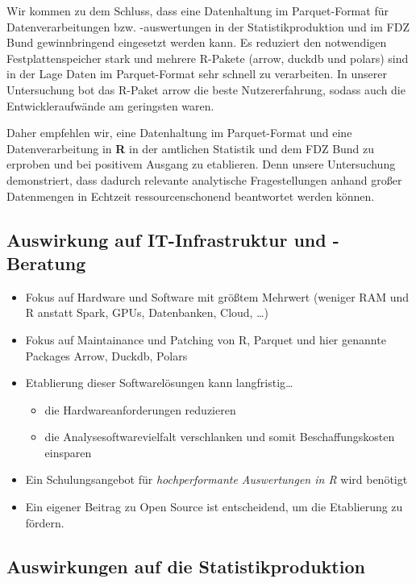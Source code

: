 \documentclass[
  german,
  10pt,
  twoside]{article}
\providecommand{\tightlist}{%
  \setlength{\itemsep}{0pt}\setlength{\parskip}{0pt}}
\let\oldtextbf\textbf
\renewcommand{\textbf}[1]{{\color{wistaBlue}\oldtextbf{#1}}}
\begin{document}
Wir kommen zu dem Schluss, dass eine Datenhaltung im Parquet-Format für
Datenverarbeitungen bzw. -auswertungen in der Statistikproduktion und im
FDZ Bund gewinnbringend eingesetzt werden kann. Es reduziert den
notwendigen Festplattenspeicher stark und mehrere R-Pakete (arrow,
duckdb und polars) sind in der Lage Daten im Parquet-Format sehr schnell
zu verarbeiten. In unserer Untersuchung bot das R-Paket arrow die beste
Nutzererfahrung, sodass auch die Entwickleraufwände am geringsten waren.

Daher empfehlen wir, eine Datenhaltung im Parquet-Format und eine
Datenverarbeitung in \textbf{R} in der amtlichen Statistik und dem FDZ
Bund zu erproben und bei positivem Ausgang zu etablieren. Denn unsere
Untersuchung demonstriert, dass dadurch relevante analytische
Fragestellungen anhand großer Datenmengen in Echtzeit ressourcenschonend
beantwortet werden können.

\subsection{Auswirkung auf IT-Infrastruktur und
-Beratung}\label{auswirkung-auf-it-infrastruktur-und--beratung}

\begin{itemize}
\tightlist
\item
  Fokus auf Hardware und Software mit größtem Mehrwert (weniger RAM und
  R anstatt Spark, GPUs, Datenbanken, Cloud, \ldots)
\item
  Fokus auf Maintainance und Patching von R, Parquet und hier genannte
  Packages Arrow, Duckdb, Polars
\item
  Etablierung dieser Softwarelösungen kann langfristig\ldots{}

  \begin{itemize}
  \tightlist
  \item
    die Hardwareanforderungen reduzieren
  \item
    die Analysesoftwarevielfalt verschlanken und somit
    Beschaffungskosten einsparen
  \end{itemize}
\item
  Ein Schulungsangebot für \emph{hochperformante Auswertungen in R} wird
  benötigt
\item
  Ein eigener Beitrag zu Open Source ist entscheidend, um die
  Etablierung zu fördern.
\end{itemize}

\subsection{Auswirkungen auf die
Statistikproduktion}\label{auswirkungen-auf-die-statistikproduktion}
\end{document}
